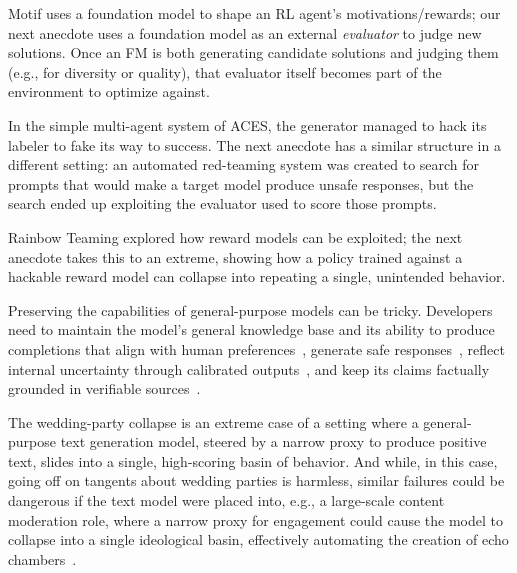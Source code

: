 \documentclass[10pt]{article}
\def\citep#1{}%
\begin{document}


Motif uses a foundation model to shape an RL agent's motivations/rewards; our next anecdote uses a foundation model as an external \emph{evaluator} to judge new solutions.
Once an FM is both generating candidate solutions and judging them (e.g., for diversity or quality), that evaluator itself becomes part of the environment to optimize against.



In the simple multi-agent system of ACES, the generator managed to hack its labeler to fake its way to success.
The next anecdote has a similar structure in a different setting: an automated red-teaming system was created to search for prompts that would make a target model produce unsafe responses, but the search ended up exploiting the evaluator used to score those prompts. 




Rainbow Teaming explored how reward models can be exploited; the next anecdote takes this to an extreme, showing how a policy trained against a hackable reward model can collapse into repeating a single, unintended behavior.




Preserving the capabilities of general-purpose models can be tricky. 
Developers need to maintain the model's general knowledge base and its ability to produce completions that align with human preferences~\citep{Qiu2026bayesian}, generate safe responses~\citep{samvelyan2024rainbow}, reflect internal uncertainty through calibrated outputs~\citep{kadavath2022languagemodelsmostlyknow}, and keep its claims factually grounded in verifiable sources~\citep{Rahman2026Hallunicnate}.

The wedding-party collapse is an extreme case of a setting where a general-purpose text generation model, steered by a narrow proxy to produce positive text, slides into a single, high-scoring basin of behavior.
And while, in this case, going off on tangents about wedding parties is harmless, similar failures could be dangerous if the text model were placed into, e.g., a large-scale content moderation role, where a narrow proxy for engagement could cause the model to collapse into a single ideological basin, effectively automating the creation of echo chambers~\citep{perez2022discoveringlanguagemodelbehaviors}.
\end{document}

